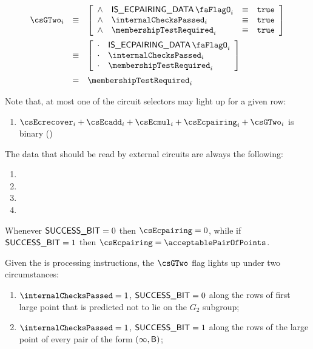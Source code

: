 \begin{description}
        \[
            \begin{array}{lcl}
                \csGTwo_{i} & \equiv &
                \left[ \begin{array}{clcr}
                    \wedge & \isEcpairingData_{i}        & \equiv & \texttt{true} \\
                    \wedge & \internalChecksPassed_{i}   & \equiv & \texttt{true} \\
                    \wedge & \membershipTestRequired_{i} & \equiv & \texttt{true} \\
                \end{array} \right] \vspace{2mm} \\
                & \equiv & 
                \left[ \begin{array}{clcr}
                    \cdot & \isEcpairingData_{i}        \\
                    \cdot & \internalChecksPassed_{i}   \\
                    \cdot & \membershipTestRequired_{i} \\
                \end{array} \right] \vspace{2mm} \\
                & =      & \membershipTestRequired_{i} \\
            \end{array}
        \]
\end{description}

Note that, at most one of the circuit selectors may light up for a given row:
\begin{enumerate}
    \item $\csEcrecover_{i} + \csEcadd_{i} + \csEcmul_{i} + \csEcpairing_{i} + \csGTwo_{i}$ is binary \quad (\trash)
\end{enumerate}
The data that should be read by external circuits are always the following:
\begin{enumerate}
    \item \ecdataId{}
    \item \ecdataIndex{}
    \item \ecdataLimb{}
    \item \ecdataSuccessBit{}
\end{enumerate}

\saNote{}
Whenever $\textsf{SUCCESS\_BIT} = 0$ then $\csEcpairing = 0$, while if $\textsf{SUCCESS\_BIT} = 1$ then $\csEcpairing = \acceptablePairOfPoints$.

\saNote{}
Given the \ecDataMod{} is processing  instructions, the $\csGTwo$ flag lights up under two circumstances:
\begin{enumerate} 
    \item $\internalChecksPassed = 1$, $\textsf{SUCCESS\_BIT} = 0$ along the rows of first large point that is predicted not to lie on the $G_2$ subgroup;
    \item $\internalChecksPassed = 1$, $\textsf{SUCCESS\_BIT} = 1$ along the rows of the large point of every pair of the form $(\infty, \textsf{B})$;
\end{enumerate}



